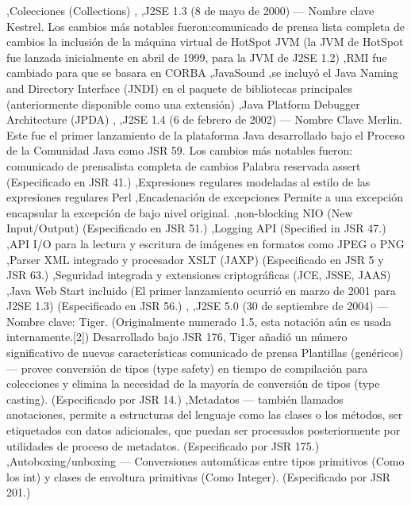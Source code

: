 \documentclass[11pt,a4paper]{$type}
\begin{document}
							,Colecciones (Collections)
	\bigskip
							,
	\bigskip
							,J2SE 1.3 (8 de mayo de 2000) — Nombre clave Kestrel. Los cambios más notables fueron:comunicado de prensa lista completa de cambios la inclusión de la máquina virtual de HotSpot JVM (la JVM de HotSpot fue lanzada inicialmente en abril de 1999, para la JVM de J2SE 1.2)
	\bigskip
							,RMI fue cambiado para que se basara en CORBA
	\bigskip
							,JavaSound
	\bigskip
							,se incluyó el Java Naming and Directory Interface (JNDI) en el paquete de bibliotecas principales (anteriormente disponible como una extensión)
	\bigskip
							,Java Platform Debugger Architecture (JPDA)
	\bigskip
							,
	\bigskip
							,J2SE 1.4 (6 de febrero de 2002) — Nombre Clave Merlin. Este fue el primer lanzamiento de la plataforma Java desarrollado bajo el Proceso de la Comunidad Java como JSR 59. Los cambios más notables fueron: comunicado de prensalista completa de cambios Palabra reservada assert (Especificado en JSR 41.)
	\bigskip
							,Expresiones regulares modeladas al estilo de las expresiones regulares Perl
	\bigskip
							,Encadenación de excepciones Permite a una excepción encapsular la excepción de bajo nivel original.
	\bigskip
							,non-blocking NIO (New Input/Output) (Especificado en JSR 51.)
	\bigskip
							,Logging API (Specified in JSR 47.)
	\bigskip
							,API I/O para la lectura y escritura de imágenes en formatos como JPEG o PNG
	\bigskip
							,Parser XML integrado y procesador XSLT (JAXP) (Especificado en JSR 5 y JSR 63.)
	\bigskip
							,Seguridad integrada y extensiones criptográficas (JCE, JSSE, JAAS)
	\bigskip
							,Java Web Start incluido (El primer lanzamiento ocurrió en marzo de 2001 para J2SE 1.3) (Especificado en JSR 56.)
	\bigskip
							,
	\bigskip
							,J2SE 5.0 (30 de septiembre de 2004) — Nombre clave: Tiger. (Originalmente numerado 1.5, esta notación aún es usada internamente.[2]) Desarrollado bajo JSR 176, Tiger añadió un número significativo de nuevas características comunicado de prensa Plantillas (genéricos) — provee conversión de tipos (type safety) en tiempo de compilación para colecciones y elimina la necesidad de la mayoría de conversión de tipos (type casting). (Especificado por JSR 14.)
	\bigskip
							,Metadatos — también llamados anotaciones, permite a estructuras del lenguaje como las clases o los métodos, ser etiquetados con datos adicionales, que puedan ser procesados posteriormente por utilidades de proceso de metadatos. (Especificado por JSR 175.)
	\bigskip
							,Autoboxing/unboxing — Conversiones automáticas entre tipos primitivos (Como los int) y clases de envoltura primitivas (Como Integer). (Especificado por JSR 201.)
\end{document}
